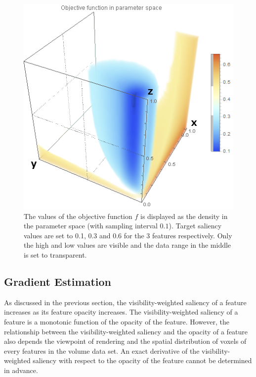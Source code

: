 \begin{figure}
	\centering
	\begin{minipage}{.6\textwidth}
		\includegraphics[width=1\linewidth]{images/parameterspace}
	\end{minipage}
	\caption{The values of the objective function $  f $ is displayed as the density in the parameter space (with sampling interval $ 0.1 $). Target saliency values are set to 0.1, 0.3 and 0.6 for the 3 features respectively. Only the high and low values are visible and the data range in the middle is set to transparent.}
	\label{fig:nucleon_parameterspace}
\end{figure}

\subsection{Gradient Estimation}
As discussed in the previous section, the visibility-weighted saliency of a feature increases as its feature opacity increases. The visibility-weighted saliency of a feature is a monotonic function of the opacity of the feature. However, the relationship between the visibility-weighted saliency and the opacity of a feature also depends the viewpoint of rendering and the spatial distribution of voxels of every features in the volume data set. An exact derivative of the visibility-weighted saliency with respect to the opacity of the feature cannot be determined in advance.

